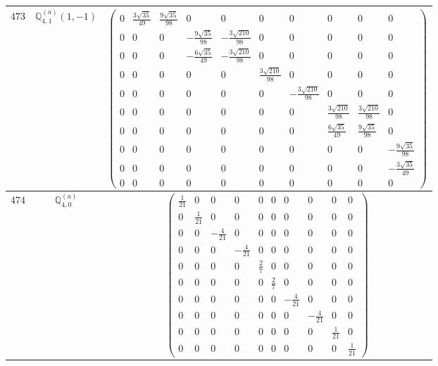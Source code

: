 \documentclass[fleqn,8pt,landscape]{jsarticle}
\begin{document}
\begin{center}
\begin{longtable}{ccc}
$ 473 $ & $ \mathbb{Q}_{4,1}^{(a)}(1,-1) $ & $ \begin{pmatrix} 0 & \frac{3 \sqrt{35}}{49} & \frac{9 \sqrt{35}}{98} & 0 & 0 & 0 & 0 & 0 & 0 & 0 \\ 0 & 0 & 0 & - \frac{9 \sqrt{35}}{98} & - \frac{3 \sqrt{210}}{98} & 0 & 0 & 0 & 0 & 0 \\ 0 & 0 & 0 & - \frac{6 \sqrt{35}}{49} & - \frac{3 \sqrt{210}}{98} & 0 & 0 & 0 & 0 & 0 \\ 0 & 0 & 0 & 0 & 0 & \frac{3 \sqrt{210}}{98} & 0 & 0 & 0 & 0 \\ 0 & 0 & 0 & 0 & 0 & 0 & - \frac{3 \sqrt{210}}{98} & 0 & 0 & 0 \\ 0 & 0 & 0 & 0 & 0 & 0 & 0 & \frac{3 \sqrt{210}}{98} & \frac{3 \sqrt{210}}{98} & 0 \\ 0 & 0 & 0 & 0 & 0 & 0 & 0 & \frac{6 \sqrt{35}}{49} & \frac{9 \sqrt{35}}{98} & 0 \\ 0 & 0 & 0 & 0 & 0 & 0 & 0 & 0 & 0 & - \frac{9 \sqrt{35}}{98} \\ 0 & 0 & 0 & 0 & 0 & 0 & 0 & 0 & 0 & - \frac{3 \sqrt{35}}{49} \\ 0 & 0 & 0 & 0 & 0 & 0 & 0 & 0 & 0 & 0 \end{pmatrix} $ \\ \hline
$ 474 $ & $ \mathbb{Q}_{4,0}^{(a)} $ & $ \begin{pmatrix} \frac{1}{21} & 0 & 0 & 0 & 0 & 0 & 0 & 0 & 0 & 0 \\ 0 & \frac{1}{21} & 0 & 0 & 0 & 0 & 0 & 0 & 0 & 0 \\ 0 & 0 & - \frac{4}{21} & 0 & 0 & 0 & 0 & 0 & 0 & 0 \\ 0 & 0 & 0 & - \frac{4}{21} & 0 & 0 & 0 & 0 & 0 & 0 \\ 0 & 0 & 0 & 0 & \frac{2}{7} & 0 & 0 & 0 & 0 & 0 \\ 0 & 0 & 0 & 0 & 0 & \frac{2}{7} & 0 & 0 & 0 & 0 \\ 0 & 0 & 0 & 0 & 0 & 0 & - \frac{4}{21} & 0 & 0 & 0 \\ 0 & 0 & 0 & 0 & 0 & 0 & 0 & - \frac{4}{21} & 0 & 0 \\ 0 & 0 & 0 & 0 & 0 & 0 & 0 & 0 & \frac{1}{21} & 0 \\ 0 & 0 & 0 & 0 & 0 & 0 & 0 & 0 & 0 & \frac{1}{21} \end{pmatrix} $ \\ \hline

\end{longtable}
\end{center}
\end{document}
